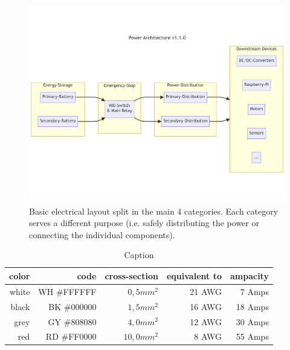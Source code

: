     \begin{figure}[h]
    \includegraphics[width=\textwidth]{contents/figures/power-architecture-v1.1.0.png}
    \caption{Basic electrical layout split in the main 4 categories. Each category serves a different purpose (i.e. safely distributing the power or connecting the individual components).}
    \label{power_architecture}
    \end{figure}

    \clearpage

    

    
    \begin{table}
        \centering
        \begin{tabular}{|r|r|r|r|r|} \hline 
             color&  code &  cross-section&  equivalent to& ampacity\\ \hline 
             white&  WH \#FFFFFF&  $0,5mm^2$&  21 AWG& 7 Amps\\ \hline 
             black&  BK \#000000&  $1,5mm^2$&  16 AWG& 18 Amps\\ \hline 
             grey&   GY \#808080&  $4,0mm^2$&  12 AWG& 30 Amps\\ \hline 
             red&    RD \#FF0000&  $10,0mm^2$&  8 AWG& 55 Amps\\ \hline
        \end{tabular}
        \caption{Caption}
        \label{color-codes}
    \end{table}

    \clearpage

